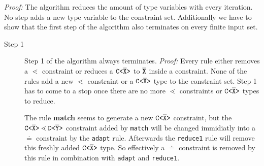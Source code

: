 \textit{Proof:}
The \unify{} algorithm reduces the amount of type variables with every iteration.
No step adds a new type variable to the constraint set.
Additionally we have to show that the first step of the algorithm also terminates on every finite input set.

\begin{description}
\item[Step 1] 
Step 1 of the algorithm always terminates. \textit{Proof:}
Every rule either removes a $\lessdot$ constraint or reduces a $\mathtt{C \texttt{<} \overline{\tt X} \texttt{>} }$ to $\overline{\tt X}$ inside a constraint.
None of the rules add a new $\lessdot$ constraint or a $\mathtt{C \texttt{<} \overline{\tt X} \texttt{>} }$ type to the constraint set.
Step 1 has to come to a stop once there are no more $\lessdot$ constraints or $\mathtt{C \texttt{<} \overline{\tt X} \texttt{>} }$ types to reduce.

The rule \textbf{match} seems to generate a new $\mathtt{C \texttt{<} \overline{\tt X} \texttt{>} }$ constraint,
but the $\mathtt{C \texttt{<} \overline{\tt X} \texttt{>} } \lessdot \mathtt{D \texttt{<} \overline{\tt Y} \texttt{>} }$ constraint added by \texttt{match}
will be changed immidiatly into a $\doteq$ constraint by the \texttt{adapt} rule.
Afterwards the \texttt{reduce1} rule will remove this freshly added $\mathtt{C \texttt{<} \overline{\tt X} \texttt{>} }$ type.
So effectively a $\doteq$ constraint is removed by this rule in combination with \texttt{adapt} and \texttt{reduce1}.


\end{description}
